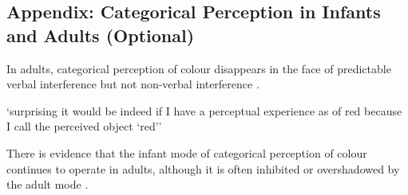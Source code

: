 \documentclass[12pt]{extarticle}
\begin{document}
\begin{multicols}{3}
\section{Appendix: Categorical Perception in Infants and Adults (Optional)}

In adults, categorical perception of colour disappears in the face of predictable verbal interference but not non-verbal interference
\citep{Roberson:2000ge,Pilling:2003bi,Wiggett:2008xt}.

‘surprising it would be indeed if I have a perceptual experience as of red because I call the perceived object ‘red’’
\citep[pp.\ 324--5]{Stokes:2006fd}

There is evidence that the infant mode of categorical perception of colour continues to operate in adults, although it is often inhibited or overshadowed by the adult mode \citep{Gilbert:2006yb}.


\footnotesize


\end{multicols}
\end{document}
